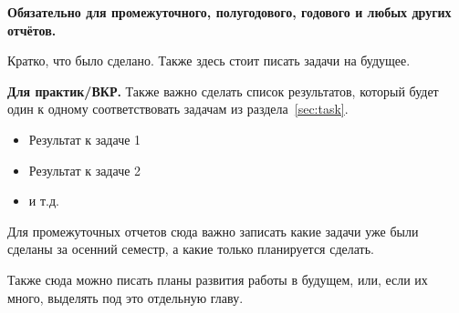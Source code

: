 
\textbf{Обязательно для промежуточного, полугодового, годового и  любых других отчётов.}

Кратко, что было сделано. Также здесь стоит писать задачи на будущее.

\textbf{Для практик/ВКР.} Также важно сделать список результатов, который будет один к одному соответствовать задачам из раздела~\ref{sec:task}.

\begin{itemize}
\item Результат к задаче 1 
\item Результат к задаче 2
\item и т.д.
\end{itemize}
\noindent Для промежуточных отчетов сюда важно записать какие задачи уже были сделаны за осенний семестр, а какие только планируется сделать.

Также сюда можно писать планы развития работы в будущем, или, если их много, выделять под это отдельную главу.

